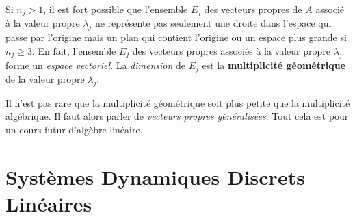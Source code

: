 {\begin{rmk}[\theory]
Si $n_j>1$, il est fort possible que l'ensemble $E_j$ des vecteurs
propres de $A$ associé à la valeur propre $\lambda_j$ ne représente
pas seulement une droite dans l'espace qui passe par l'origine mais un
plan qui contient l'origine ou un espace plus grande si $n_j\geq 3$.
En fait, l'ensemble $E_j$ des vecteurs propres associés à la valeur
propre $\lambda_j$ forme un {\em espace vectoriel}.  La
{\em dimension} de $E_j$ est la
{\bfseries multiplicité géométrique} de la valeur propre $\lambda_j$.  

Il n'est pas rare que la multiplicité géométrique soit plus petite que
la multiplicité algébrique.  Il faut alors parler de
{\em vecteurs propres généralisées}.
Tout cela est pour un cours futur d'algèbre linéaire.
\end{rmk}

\section{Systèmes Dynamiques Discrets Linéaires \life}

}
